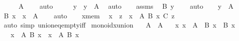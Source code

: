 \begin{isabellebody}
\ \ \isamarkupfalse%
\ \isamarkupfalse%
\ {\isachardoublequoteopen}A\ {\isasymnoteq}\ {\isacharbraceleft}{\kern0pt}{\isacharbraceright}{\kern0pt}{\isachardoublequoteclose}\ \isamarkupfalse%
\ auto\isanewline
\ \ \isamarkupfalse%
\ \isamarkupfalse%
\ y\ \ {\isachardoublequoteopen}y\ {\isasymin}\ A{\isachardoublequoteclose}\ \isamarkupfalse%
\ auto\isanewline
\ \ \isamarkupfalse%
\ assms\ \isamarkupfalse%
\ {\isachardoublequoteopen}B\ y\ {\isasymnoteq}\ {\isacharbraceleft}{\kern0pt}{\isacharbraceright}{\kern0pt}{\isachardoublequoteclose}\ \isamarkupfalse%
\ auto\isanewline
\ \ \isamarkupfalse%
\ {\isacartoucheopen}y\ {\isasymin}\ A{\isacartoucheclose}\ \isamarkupfalse%
\ {\isachardoublequoteopen}{\isacharbraceleft}{\kern0pt}B\ x\ {\isacharbar}{\kern0pt}\ x\ {\isasymin}\ A{\isacharbraceright}{\kern0pt}\ {\isasymnoteq}\ {\isacharbraceleft}{\kern0pt}{\isacharbraceleft}{\kern0pt}{\isacharbraceright}{\kern0pt}{\isacharbraceright}{\kern0pt}{\isachardoublequoteclose}\ \isamarkupfalse%
\ auto\isanewline
\ \ \isamarkupfalse%
\ x{\isacharunderscore}{\kern0pt}mem\ \isamarkupfalse%
\ {\isachardoublequoteopen}x\ {\isasymin}\ {\isacharparenleft}{\kern0pt}{\isasymInter}z\ {\isasymin}\ {\isacharparenleft}{\kern0pt}{\isasymUnion}x\ {\isasymin}\ A{\isachardot}{\kern0pt}\ B\ x{\isacharparenright}{\kern0pt}{\isachardot}{\kern0pt}\ C\ z{\isacharparenright}{\kern0pt}{\isachardoublequoteclose}\isanewline
\ \ \ \ \isamarkupfalse%
\ {\isacharparenleft}{\kern0pt}auto\ simp{\isacharcolon}{\kern0pt}\ union{\isacharunderscore}{\kern0pt}eq{\isacharunderscore}{\kern0pt}empty{\isacharunderscore}{\kern0pt}iff{\isacharparenright}{\kern0pt}\isanewline
{}\isamarkupfalse%
%
\endisatagproof
{\isafoldproof}%
%
\isadelimproof
\isanewline
%
\endisadelimproof
\isanewline
{}\isamarkupfalse%
\ mono{\isacharunderscore}{\kern0pt}idx{\isacharunderscore}{\kern0pt}union{\isacharcolon}{\kern0pt}\isanewline
\ \ \ {\isachardoublequoteopen}A\ {\isasymsubseteq}\ A{\isacharprime}{\kern0pt}{\isachardoublequoteclose}\isanewline
\ \ \ {\isachardoublequoteopen}{\isasymAnd}x{\isachardot}{\kern0pt}\ x\ {\isasymin}\ A\ {\isasymLongrightarrow}\ B\ x\ {\isasymsubseteq}\ B{\isacharprime}{\kern0pt}\ x{\isachardoublequoteclose}\isanewline
\ \ \ {\isachardoublequoteopen}{\isacharparenleft}{\kern0pt}{\isasymUnion}x\ {\isasymin}\ A{\isachardot}{\kern0pt}\ B\ x{\isacharparenright}{\kern0pt}\ {\isasymsubseteq}\ {\isacharparenleft}{\kern0pt}{\isasymUnion}x\ {\isasymin}\ A{\isacharprime}{\kern0pt}{\isachardot}{\kern0pt}\ B{\isacharprime}{\kern0pt}\ x{\isacharparenright}{\kern0pt}{\isachardoublequoteclose}\isanewline

\end{isabellebody}
